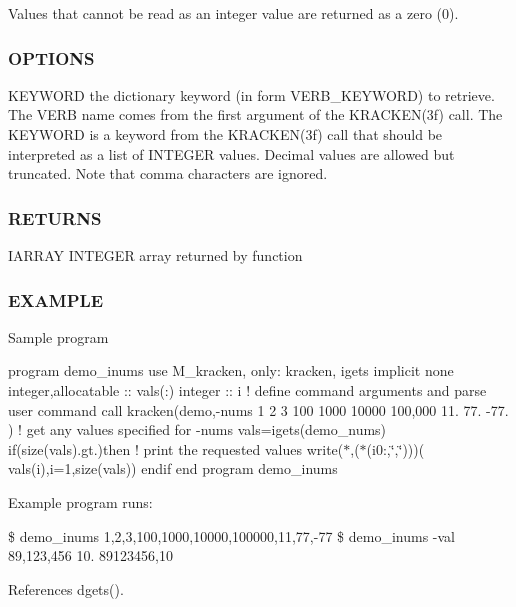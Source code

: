 Values that cannot be read as an integer value are returned as a zero (0).

\subsubsection*{O\+P\+T\+I\+O\+NS}

K\+E\+Y\+W\+O\+RD the dictionary keyword (in form V\+E\+R\+B\+\_\+\+K\+E\+Y\+W\+O\+RD) to retrieve. The V\+E\+RB name comes from the first argument of the K\+R\+A\+C\+K\+E\+N(3f) call. The K\+E\+Y\+W\+O\+RD is a keyword from the K\+R\+A\+C\+K\+E\+N(3f) call that should be interpreted as a list of I\+N\+T\+E\+G\+ER values. Decimal values are allowed but truncated. Note that comma characters are ignored.

\subsubsection*{R\+E\+T\+U\+R\+NS}

I\+A\+R\+R\+AY I\+N\+T\+E\+G\+ER array returned by function

\subsubsection*{E\+X\+A\+M\+P\+LE}

Sample program

program demo\+\_\+inums use M\+\_\+kracken, only\+: kracken, igets implicit none integer,allocatable \+:\+: vals(\+:) integer \+:\+: i ! define command arguments and parse user command call kracken(\textquotesingle{}demo\textquotesingle{},\textquotesingle{}-\/nums 1 2 3 100 1000 10000 100,000 11. 77. -\/77.\textquotesingle{} ) ! get any values specified for -\/nums vals=igets(\textquotesingle{}demo\+\_\+nums\textquotesingle{}) if(size(vals).gt.)then ! print the requested values write($\ast$,\textquotesingle{}($\ast$(i0\+:,\char`\"{},\char`\"{}))\textquotesingle{})( vals(i),i=1,size(vals)) endif end program demo\+\_\+inums

Example program runs\+:

\$ demo\+\_\+inums 1,2,3,100,1000,10000,100000,11,77,-\/77 \$ demo\+\_\+inums -\/val 89,123,456 10. 89123456,10 

References dgets().

\mbox{\label{namespacem__kracken_a850dce381e1cfe18a4ebcaa214995e39}} 
